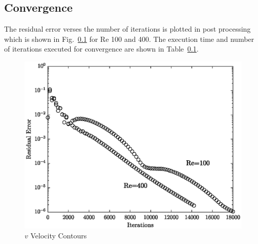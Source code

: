 \documentclass{article}
\numberwithin{equation}{section}
\numberwithin{figure}{section}
\begin{document}
\subsection{Convergence}
The residual error verses the number of iterations is plotted in post processing which is shown in  Fig.~\ref{}  for Re 100 and 400. The execution time and number of iterations executed for convergence are shown in Table~\ref{}.
\begin{figure}
    \centering
    \includegraphics{residual.eps}
    \caption{$v$ Velocity Contours}
    \label{fig:v_velocity}
\end{figure}
\end{document}
